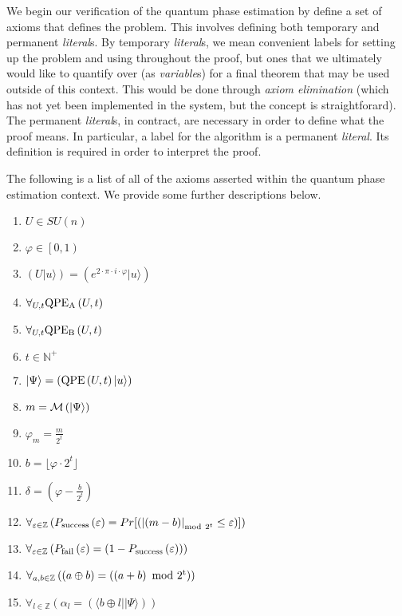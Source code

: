 \documentclass{article}[12pt]
\begin{document}
We begin our verification of the quantum phase estimation by define a set of axioms that defines the problem.  This involves defining both temporary and permanent {\em literal}s.  By temporary {\em literal}s, we mean convenient labels for setting up the problem and using throughout the proof, but ones that we ultimately would like to quantify over (as {\em variable}s) for a final theorem that may be used outside of this context.  This would be done through {\em axiom elimination} (which has not yet been implemented in the system, but the concept is straightforard).  The permanent {\em literal}s, in contract, are necessary in order to define what the proof means.  In particular, a label for the algorithm is a permanent {\em literal}.  Its definition is required in order to interpret the proof.

The following is a list of all of the axioms asserted within the quantum phase estimation context.  We provide some further descriptions below.
\begin{enumerate}
\item $U \in SU\left(n\right)$
\item $\varphi \in \left[0,1\right)$
\item $\left(U   \lvert u \rangle\right) = \left(e^{2 \cdot \pi \cdot i \cdot \varphi}   \lvert u \rangle\right)$
\item $\forall_{U, t} {\rm QPE_A}\left(U, t\right)$
\item $\forall_{U, t} {\rm QPE_B}\left(U, t\right)$  
\item $t \in \mathbb{N}^+$
\item $\lvert \Psi \rangle = \left({\rm QPE}\left(U, t\right)   \lvert u \rangle\right)$
\item $m = {\cal M}\left(\lvert \Psi \rangle\right)$
\item $\varphi_m = \frac{m}{2^{t}}$
\item $b = \lfloor \varphi \cdot 2^{t}\rfloor$
\item $\delta = \left(\varphi - \frac{b}{2^{t}}\right)$
\item $\forall_{\varepsilon \in \mathbb{Z}} \left(P_{\rm success}\left(\varepsilon\right) = Pr[\left(\left|\left(m - b\right)\right|_{{\rm mod}~2^{t}} \leq \varepsilon\right)]\right)$
\item $\forall_{\varepsilon \in \mathbb{Z}} \left(P_{\rm fail}\left(\varepsilon\right) = \left(1 - P_{\rm success}\left(\varepsilon\right)\right)\right)$
\item $\forall_{a, b \in \mathbb{Z}} \left(\left(a \oplus b\right) = \left(\left(a + b\right) ~\rm{mod}~ 2^{t}\right)\right)$
\item $\forall_{l \in \mathbb{Z}} \left(\alpha_{l} = \left(\langle b \oplus l \rvert   \lvert \Psi \rangle\right)\right)$
\end{enumerate}
\end{document}
